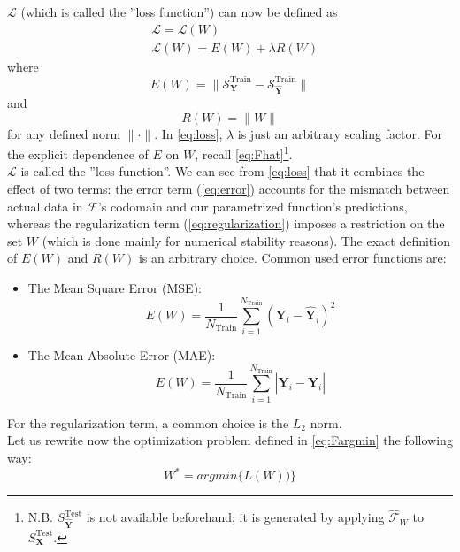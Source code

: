 %
$\mathcal{L}$ (which is called the ''loss function'') can now be defined as
\begin{align}
	& \mathcal{L}=\mathcal{L}(W) \\
	& \mathcal{L}(W)=E(W)+\lambda R(W) \label{eq:loss}
\end{align}
where
\begin{equation}\label{eq:error}
	E(W) = \|\mathcal{S}^\text{Train}_\mathbf{Y} - \mathcal{S}^\text{Train}_\mathbf{\hat{Y}}\|
\end{equation}
and
\begin{equation}\label{eq:regularization}
	R(W) = \|W\|
\end{equation}
for any defined norm $\|\cdot\|$. In \cref{eq:loss}, $\lambda$ is just an arbitrary scaling factor. For the explicit dependence of $E$ on $W$, recall \cref{eq:Fhat}\footnote{N.B. $S^\text{Test}_{\mathbf{\hat{Y}}}$ is not available beforehand; it is generated by applying $\mathcal{\hat{F}}_W$ to $S^\text{Test}_{\mathbf{X}}$.}.\\
%
\indent $\mathcal{L}$ is called the ''loss function''. We can see from \cref{eq:loss} that it combines the effect of two terms: the error term (\cref{eq:error}) accounts for the mismatch between actual data in $\mathcal{F}$'s codomain and our parametrized function's predictions, whereas the regularization term (\cref{eq:regularization}) imposes a restriction on the set $W$ (which is done mainly for numerical stability reasons). The exact definition of $E(W)$ and $R(W)$ is an arbitrary choice. Common used error functions are:
\begin{itemize}
	\item The Mean Square Error (MSE):
	\begin{equation}\label{eq:mse}
		E(W) = \frac{1}{N_{\text{Train}}} \sum_{i=1}^{N_{\text{Train}}} (\mathbf{Y}_i - \mathbf{\hat{Y}}_i)^2
	\end{equation}
	\item The Mean Absolute Error (MAE):
	\begin{equation}\label{eq:mae}
		E(W) = \frac{1}{N_{\text{Train}}} \sum_{i=1}^{N_{\text{Train}}} \left|\mathbf{Y}_i - \mathbf{\hat{Y}}_i\right|
	\end{equation}
\end{itemize}

For the regularization term, a common choice is the $L_2$ norm.\\
%
\indent Let us rewrite now the optimization problem defined in \cref{eq:Fargmin} the following way:
\begin{equation}
	W^* = argmin\{L(W))\}
\end{equation}

